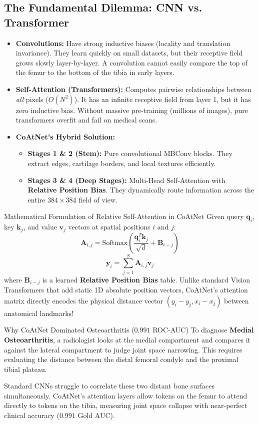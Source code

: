 \documentclass[11pt,a4paper]{article}
\begin{document}
\subsection{The Fundamental Dilemma: CNN vs. Transformer}
\begin{itemize}[leftmargin=*]
    \item \textbf{Convolutions:} Have strong inductive biases (locality and translation invariance). They learn quickly on small datasets, but their receptive field grows slowly layer-by-layer. A convolution cannot easily compare the top of the femur to the bottom of the tibia in early layers.
    \item \textbf{Self-Attention (Transformers):} Computes pairwise relationships between \textit{all} pixels ($O(N^2)$). It has an infinite receptive field from layer 1, but it has zero inductive bias. Without massive pre-training (millions of images), pure transformers overfit and fail on medical scans.
    \item \textbf{CoAtNet's Hybrid Solution:}
    \begin{itemize}[noitemsep]
        \item \textbf{Stages 1 \& 2 (Stem):} Pure convolutional MBConv blocks. They extract edges, cartilage borders, and local textures efficiently.
        \item \textbf{Stages 3 \& 4 (Deep Stages):} Multi-Head Self-Attention with \textbf{Relative Position Bias}. They dynamically route information across the entire $384\times 384$ field of view.
    \end{itemize}
\end{itemize}

\begin{mechbox}{Mathematical Formulation of Relative Self-Attention in CoAtNet}
Given query $\mathbf{q}_i$, key $\mathbf{k}_j$, and value $\mathbf{v}_j$ vectors at spatial positions $i$ and $j$:
$$\mathbf{A}_{i,j} = \text{Softmax}\left(\frac{\mathbf{q}_i^T \mathbf{k}_j}{\sqrt{d}} + \mathbf{B}_{i-j}\right)$$
$$\mathbf{y}_i = \sum_{j=1}^S \mathbf{A}_{i,j} \mathbf{v}_j$$
where $\mathbf{B}_{i-j}$ is a learned \textbf{Relative Position Bias} table. Unlike standard Vision Transformers that add static 1D absolute position vectors, CoAtNet's attention matrix directly encodes the physical distance vector $(y_i - y_j, x_i - x_j)$ between anatomical landmarks!
\end{mechbox}

\begin{breakthroughbox}{Why CoAtNet Dominated Osteoarthritis ($0.991$ ROC-AUC)}
To diagnose \textbf{Medial Osteoarthritis}, a radiologist looks at the medial compartment and compares it against the lateral compartment to judge joint space narrowing. This requires evaluating the distance between the distal femoral condyle and the proximal tibial plateau. 

Standard CNNs struggle to correlate these two distant bone surfaces simultaneously. CoAtNet's attention layers allow tokens on the femur to attend directly to tokens on the tibia, measuring joint space collapse with near-perfect clinical accuracy ($0.991$ Gold AUC).
\end{breakthroughbox}
\end{document}
